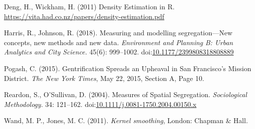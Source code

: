 \documentclass{article}
\theoremstyle{theorem}
\theoremstyle{definition}
\begin{document}
\begin{thebibliography}{3}

 Deng, H., Wickham, H. (2011) Density Estimation in R. \href{https://vita.had.co.nz/papers/density-estimation.pdf}{\url{https://vita.had.co.nz/papers/density-estimation.pdf}}

Harris, R., Johnson, R. (2018). Measuring and modelling segregation---New concepts, new methods and new data. \textit{Environment and Planning B: Urban Analytics and City Science.} 45(6): 999--1002. doi:\href{http://dx.doi.org/10.1177/2399808318808889}{10.1177/2399808318808889}

Pogash, C. (2015). Gentrification Spreads an Upheaval in San Francisco's Mission District. \textit{The New York Times}, May 22, 2015, Section A, Page 10.

Reardon, S., O'Sullivan, D. (2004). Measures of Spatial Segregation. \textit{Sociological Methodology.} 34: 121--162. doi:\href{http://dx.doi.org/10.1111/j.0081-1750.2004.00150.x}{10.1111/j.0081-1750.2004.00150.x}

 Wand, M. P., Jones, M. C. (2011). \textit{Kernel smoothing}, London: Chapman \& Hall.

\end{thebibliography}
\end{document}
